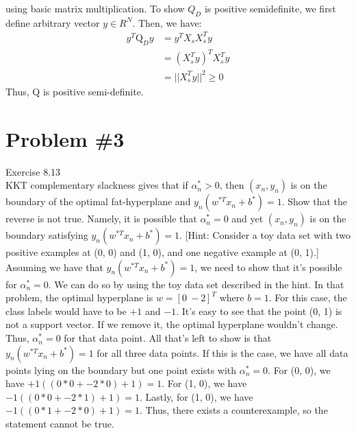 \documentclass[12pt]{article}
\begin{document}
	using basic matrix multiplication.
	To show $Q_D$ is positive semidefinite, we first define arbitrary vector $y \in R^N$. Then, we have:
	\begin{align*}
		y^T \text{Q}_D y &= y^T X_sX_s^Ty \\
		&= (X_s^Ty)^T X_s^Ty\\
		&= ||X_s^Ty||^2 \ge 0
	\end{align*}
	Thus, Q is positive semi-definite.
	\section*{Problem \#3}
	Exercise 8.13 \\
	KKT complementary slackness gives that if $\alpha_n^* > 0$, then $(x_n , y_n)$ is on
	the boundary of the optimal fat-hyperplane and $y_n (w^{*T} x_n + b^{*} ) = 1$.
	Show that the reverse is not true. Namely, it is possible that $\alpha_n^* = 0$ and
	yet $(x_n , y_n)$ is on the boundary satisfying $y_n (w^{*T} x_n + b^{*} ) = 1$.
	[Hint: Consider a toy data set with two positive examples at (0, 0) and
	(1, 0), and one negative example at (0, 1).] \\
	Assuming we have that $y_n (w^{*T} x_n + b^{*} ) = 1$, we need to show that it's possible for $\alpha_n^* = 0$. We can do so by using the toy data set described in the hint. In that problem, the optimal hyperplane is $w = [0 \ -2]^T$ where $b=1$. For this case, the class labels would have to be $+1$ and $-1$. It's easy to see that the point (0, 1) is not a support vector. If we remove it, the optimal hyperplane wouldn't change. Thus, $\alpha_n^* = 0$ for that data point. All that's left to show is that $y_n (w^{*T} x_n + b^{*} ) = 1$ for all three data points. If this is the case, we have all data points lying on the boundary but one point exists with $\alpha_n^* = 0$. For (0, 0), we have $+1 ((0*0 + -2*0) + 1)=1$. For (1, 0), we have $-1 ((0*0 + -2*1) + 1)=1$. Lastly, for (1, 0), we have $-1 ((0*1 + -2*0) + 1)=1$. Thus, there exists a counterexample, so the statement cannot be true.
\end{document}

